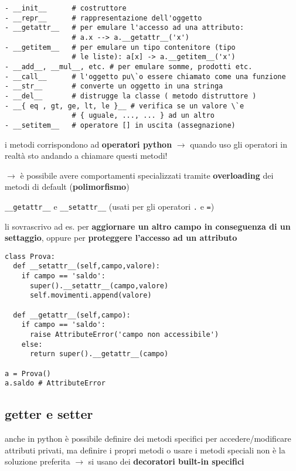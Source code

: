 \begin{verbatim}
- __init__ 		# costruttore
- __repr__ 		# rappresentazione dell'oggetto
- __getattr__ 	# per emulare l'accesso ad una attributo:
				# a.x --> a.__getattr__('x')
- __getitem__ 	# per emulare un tipo contenitore (tipo 
				# le liste): a[x] -> a.__getitem__('x')
- __add__, __mul__, etc. # per emulare somme, prodotti etc.
- __call__ 		# l'oggetto pu\`o essere chiamato come una funzione
- __str__ 		# converte un oggetto in una stringa
- __del__ 		# distrugge la classe ( metodo distruttore )
- __{ eq , gt, ge, lt, le }__ # verifica se un valore \`e
				# { uguale, ..., ... } ad un altro
- __setitem__ 	# operatore [] in uscita (assegnazione)
\end{verbatim}

i metodi corrispondono ad \textbf{operatori python} $\rightarrow$ quando uso gli operatori in realt\`a sto andando a chiamare questi metodi!

$\rightarrow$ \`e possibile avere comportamenti specializzati tramite \textbf{overloading} dei metodi di default (\textbf{polimorfismo})

\texttt{__getattr__} e \texttt{__setattr__} (usati per gli operatori \texttt{.} e \texttt{=})

li sovrascrivo ad es. per \textbf{aggiornare un altro campo in conseguenza di un settaggio}, oppure per \textbf{proteggere l'accesso ad un attributo}

\begin{verbatim}
class Prova:
  def __setattr__(self,campo,valore):
    if campo == 'saldo':
      super().__setattr__(campo,valore)
      self.movimenti.append(valore)
  
  def __getattr__(self,campo):
    if campo == 'saldo':
      raise AttributeError('campo non accessibile')
    else:
      return super().__getattr__(campo)

a = Prova()
a.saldo # AttributeError
\end{verbatim}

\subsection{getter e setter}

anche in python \`e possibile definire dei metodi specifici per accedere/modificare attributi privati, ma definire i propri metodi o usare i metodi speciali non \`e la soluzione preferita $\rightarrow$ si usano dei \textbf{decoratori built-in specifici}

